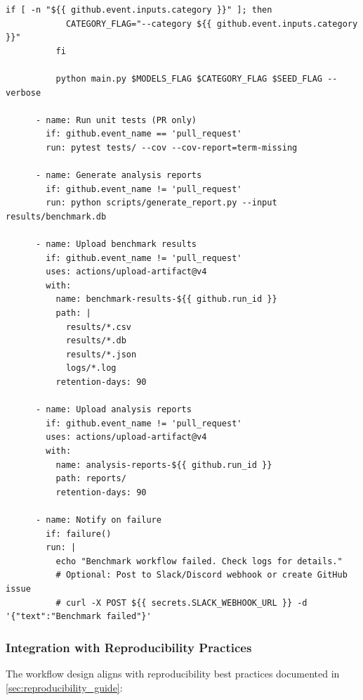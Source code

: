 \begin{lstlisting}[basicstyle=\ttfamily\footnotesize,breaklines=true,frame=single,caption={Complete GitHub Actions workflow for automated benchmark execution.\label{lst:github_actions_full}}]
          if [ -n "${{ github.event.inputs.category }}" ]; then
            CATEGORY_FLAG="--category ${{ github.event.inputs.category }}"
          fi
          
          python main.py $MODELS_FLAG $CATEGORY_FLAG $SEED_FLAG --verbose
      
      - name: Run unit tests (PR only)
        if: github.event_name == 'pull_request'
        run: pytest tests/ --cov --cov-report=term-missing
      
      - name: Generate analysis reports
        if: github.event_name != 'pull_request'
        run: python scripts/generate_report.py --input results/benchmark.db
      
      - name: Upload benchmark results
        if: github.event_name != 'pull_request'
        uses: actions/upload-artifact@v4
        with:
          name: benchmark-results-${{ github.run_id }}
          path: |
            results/*.csv
            results/*.db
            results/*.json
            logs/*.log
          retention-days: 90
      
      - name: Upload analysis reports
        if: github.event_name != 'pull_request'
        uses: actions/upload-artifact@v4
        with:
          name: analysis-reports-${{ github.run_id }}
          path: reports/
          retention-days: 90
      
      - name: Notify on failure
        if: failure()
        run: |
          echo "Benchmark workflow failed. Check logs for details."
          # Optional: Post to Slack/Discord webhook or create GitHub issue
          # curl -X POST ${{ secrets.SLACK_WEBHOOK_URL }} -d '{"text":"Benchmark failed"}'
\end{lstlisting}

\subsubsection{Integration with Reproducibility Practices}

The workflow design aligns with reproducibility best practices documented in \cref{sec:reproducibility_guide}:

